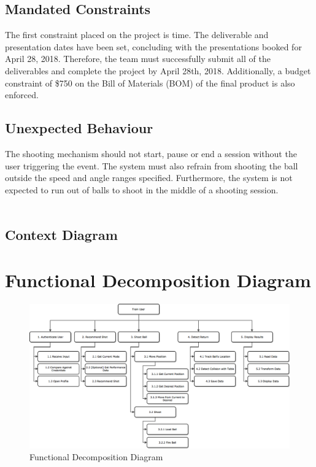 \documentclass[11pt]{article}
\begin{document}
\subsection{Mandated Constraints}
The first constraint placed on the project is time. The deliverable and presentation dates have been set, concluding with the presentations booked for April 28, 2018. Therefore, the team must successfully submit all of the deliverables and complete the project by April 28th, 2018. Additionally, a budget constraint of \$750 on the Bill of Materials (BOM) of the final product is also enforced.
\subsection{Unexpected Behaviour} 
The shooting mechanism should not start, pause or end a session without the user triggering the event. The system must also refrain from shooting the ball outside the speed and angle ranges specified. Furthermore, the system is not expected to run out of balls to shoot in the middle of a shooting session. \\\\




\subsection{Context Diagram} %


\section{Functional Decomposition Diagram}
\begin{figure}[H]
   \centering
   \includegraphics[width=\textwidth]{diagrams/FDD.png}
   \caption{Functional Decomposition Diagram}
   \label{fig:fdd}
\end{figure}
\end{document}
